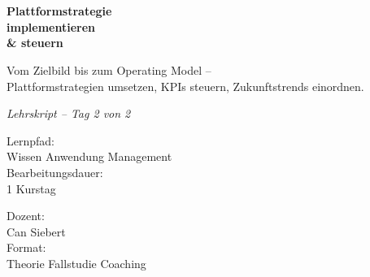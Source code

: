 \documentclass[11pt,a4paper,oneside]{article}
\newcommand{\caveatfontfallback}{\itshape}
\newcommand\caveatfont{\caveatfontfallback}%
\begin{document}
\begin{titlepage}
  \pagestyle{empty}
  \vspace*{1.5cm}
  \\[2pt]
  \noindent{\color{lpAccent}\rule{\linewidth}{1.2pt}}\\[4pt]

  \vspace{3cm}
  {\sffamily\fontsize{30}{34}\selectfont\bfseries\color{lpInk}Plattformstrategie\\implementieren\\\& steuern\par}

  \vspace{0.7cm}
  {\sffamily\large\color{lpGray}Vom Zielbild bis zum Operating Model --\\Plattformstrategien umsetzen, KPIs steuern, Zukunftstrends einordnen.\par}

  \vspace{1.5cm}
  {\caveatfont\LARGE\color{lpAmber}Lehrskript -- Tag 2 von 2}\par

  \vfill

  \noindent\begin{minipage}{0.55\linewidth}
    {\sffamily\footnotesize\color{lpGray}Lernpfad:}\\
    {\sffamily\small\color{lpInk}Wissen \textrightarrow{} Anwendung \textrightarrow{} Management}\\[10pt]
    {\sffamily\footnotesize\color{lpGray}Bearbeitungsdauer:}\\
    {\sffamily\small\color{lpInk}1 Kurstag}
  \end{minipage}\hfill
  \begin{minipage}{0.4\linewidth}
    \raggedleft
    {\sffamily\footnotesize\color{lpGray}Dozent:}\\
    {\sffamily\small\color{lpInk}Can Siebert}\\[10pt]
    {\sffamily\footnotesize\color{lpGray}Format:}\\
    {\sffamily\small\color{lpInk}Theorie \textperiodcentered{} Fallstudie \textperiodcentered{} Coaching}
  \end{minipage}

  \vspace{0.5cm}
  \noindent{\color{lpAccent}\rule{\linewidth}{0.6pt}}
\end{titlepage}
\end{document}
